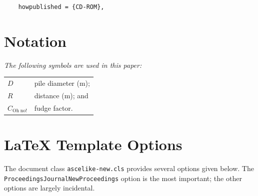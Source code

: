 \documentclass[
  NewProceedings,
  letterpaper]{./assets/ascelike-new}
\begin{document}
\begin{verbatim}
    howpublished = {CD-ROM},
\end{verbatim}

\appendix

\hypertarget{sec-app-notation}{%
\section{Notation}\label{sec-app-notation}}

\emph{The following symbols are used in this paper:}

\begin{longtable}[]{@{}ll@{}}
\toprule()
\endhead
\(D\) & pile diameter (m); \\
\(R\) & distance (m); and \\
\(C_{\mathrm{Oh\;no!}}\) & fudge factor. \\
\bottomrule()
\end{longtable}

\hypertarget{sec-app-options}{%
\section{LaTeX Template Options}\label{sec-app-options}}

The document class \texttt{ascelike-new.cls} provides several options
given below. The
\texttt{Proceedings\textbar{}\textasciigrave{}\textasciigrave{}Journal\textbar{}\textasciigrave{}\textasciigrave{}NewProceedings}
option is the most important; the other options are largely incidental.
\end{document}
